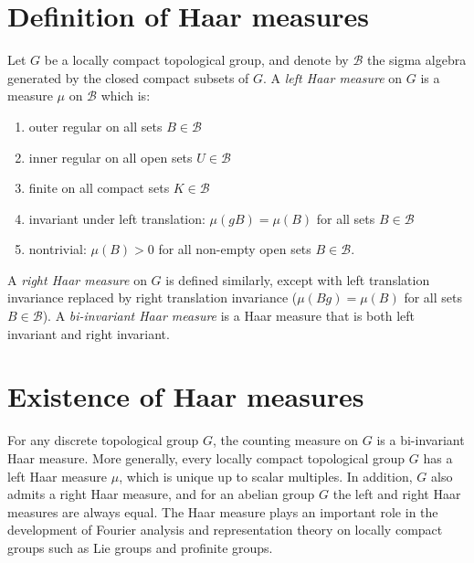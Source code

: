 \documentclass[12pt]{article}
\begin{document}
\section{Definition of Haar measures}

Let $G$ be a locally compact topological group, and denote by $\mathcal{B}$ the sigma algebra generated by the closed compact subsets of $G$. A \emph{left Haar measure} on $G$ is a measure $\mu$ on $\mathcal{B}$ which is:
\begin{enumerate}
\item outer regular on all sets $B \in \mathcal{B}$
\item inner regular on all open sets $U \in \mathcal{B}$
\item finite on all compact sets $K \in \mathcal{B}$
\item invariant under left translation: $\mu(gB) = \mu(B)$ for all sets $B \in \mathcal{B}$
\item nontrivial: $\mu(B) > 0$ for all non-empty open sets $B \in \mathcal{B}$.
\end{enumerate}

A \emph{right Haar measure} on $G$ is defined similarly, except with left translation invariance replaced by right translation invariance ($\mu(Bg) = \mu(B)$ for all sets $B \in \mathcal{B}$). A \emph{bi-invariant Haar measure} is a Haar measure that is both left invariant and right invariant.

\section{Existence of Haar measures}

For any discrete topological group $G$, the counting measure on $G$ is a bi-invariant Haar measure. More generally, every locally compact topological group $G$ has a left Haar measure $\mu$, which is unique up to scalar multiples. In addition, $G$ also admits a right Haar measure, and for an abelian group $G$ the left and right Haar measures are always equal. The Haar measure plays an important role in the development of Fourier analysis and representation theory on locally compact groups such as Lie groups and profinite groups.

\end{document}
